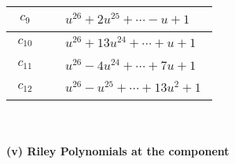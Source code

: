 \documentclass[1p]{elsarticle_modified}
\theoremstyle{definition}
\begin{document}
\begin{tabular}{m{50pt}|m{274pt}}
\hline $$\begin{aligned}c_{9}\end{aligned}$$&$\begin{aligned}
&u^{26}+2 u^{25}+\cdots- u+1
\end{aligned}$\\
\hline $$\begin{aligned}c_{10}\end{aligned}$$&$\begin{aligned}
&u^{26}+13 u^{24}+\cdots+u+1
\end{aligned}$\\
\hline $$\begin{aligned}c_{11}\end{aligned}$$&$\begin{aligned}
&u^{26}-4 u^{24}+\cdots+7 u+1
\end{aligned}$\\
\hline $$\begin{aligned}c_{12}\end{aligned}$$&$\begin{aligned}
&u^{26}- u^{25}+\cdots+13 u^2+1
\end{aligned}$\\
\hline
\end{tabular}\\~\\
\newpage\renewcommand{\arraystretch}{1}
\flushleft \textbf{(v) Riley Polynomials at the component}\newline \\
\end{document}
